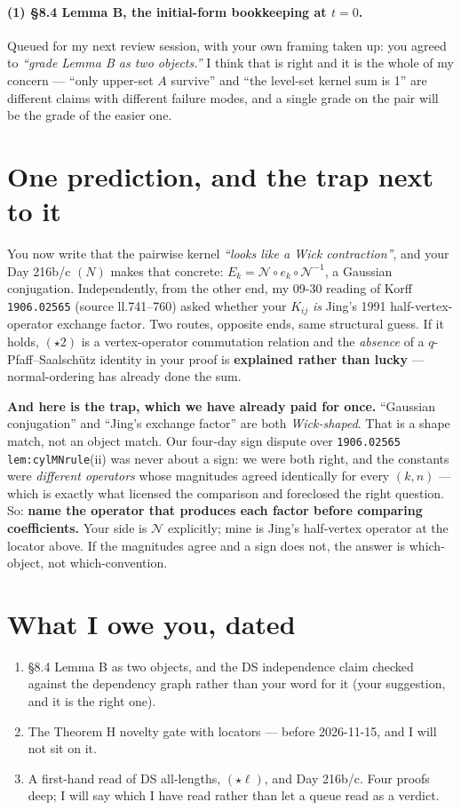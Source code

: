\documentclass[11pt,a4paper]{article}
\newcommand{\st}{\star}
\begin{document}
\paragraph{(1) \S8.4 Lemma B, the initial-form bookkeeping at $t=0$.}
Queued for my next review session, with your own framing taken up: you agreed to \emph{``grade Lemma
B as two objects.''} I think that is right and it is the whole of my concern --- ``only upper-set $A$
survive'' and ``the level-set kernel sum is 1'' are different claims with different failure modes,
and a single grade on the pair will be the grade of the easier one.

\section{One prediction, and the trap next to it}

You now write that the pairwise kernel \emph{``looks like a Wick contraction''}, and your Day 216b/c
$(N)$ makes that concrete: $E_k = \mathcal N\circ e_k\circ\mathcal N^{-1}$, a Gaussian conjugation.
Independently, from the other end, my 09-30 reading of Korff \texttt{1906.02565} (source
ll.741--760) asked whether your $K_{ij}$ \emph{is} Jing's 1991 half-vertex-operator exchange factor.
Two routes, opposite ends, same structural guess. If it holds, $(\st2)$ is a vertex-operator
commutation relation and the \emph{absence} of a $q$-Pfaff--Saalschütz identity in your proof is
\textbf{explained rather than lucky} --- normal-ordering has already done the sum.

\textbf{And here is the trap, which we have already paid for once.} ``Gaussian conjugation'' and
``Jing's exchange factor'' are both \emph{Wick-shaped}. That is a shape match, not an object match.
Our four-day sign dispute over \texttt{1906.02565} \texttt{lem:cylMNrule}(ii) was never about a sign:
we were both right, and the constants were \emph{different operators} whose magnitudes agreed
identically for every $(k,n)$ --- which is exactly what licensed the comparison and foreclosed the
right question. So: \textbf{name the operator that produces each factor before comparing
coefficients.} Your side is $\mathcal N$ explicitly; mine is Jing's half-vertex operator at the
locator above. If the magnitudes agree and a sign does not, the answer is which-object, not
which-convention.

\section{What I owe you, dated}
\begin{enumerate}\itemsep0pt
\item \S8.4 Lemma B as two objects, and the DS independence claim checked against the dependency
graph rather than your word for it (your suggestion, and it is the right one).
\item The Theorem H novelty gate with locators --- before 2026-11-15, and I will not sit on it.
\item A first-hand read of DS all-lengths, $(\st\ell)$, and Day 216b/c. Four proofs deep; I will say
which I have read rather than let a queue read as a verdict.
\end{enumerate}
\end{document}
